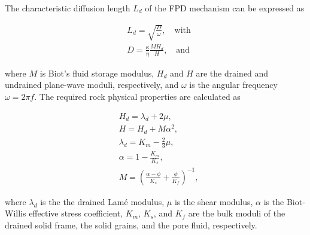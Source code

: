 \documentclass[draft]{agujournal2019}
\begin{document}
The characteristic diffusion length $L_d$ of the FPD mechanism can be expressed as 
\begin{linenomath*}
\begin{equation}\label{Eq.3}
\begin{split}
&L_d=\sqrt{\frac{D}{\omega}},\quad \text{with} \\
&D= \frac {\kappa} {\eta} \frac{M H_d}{H},
 \quad \text{and}  
\end{split}
\end{equation}
\end{linenomath*}
where $M$ is Biot’s fluid storage modulus, $H_d$ and $H$ are the drained and undrained plane-wave moduli, respectively, and $\omega$ is the angular frequency $\omega = 2 \pi f$. 
The required rock physical properties are calculated as
\begin{linenomath*}
\begin{equation}\label{Eq.7}
\begin{split}
& H_d = \lambda_d + 2 \mu, \\
& H = H_d + M \alpha ^2, \\
& \lambda_d= K_m - \frac{2}{3} \mu, \\
& \alpha =1-\frac{K_m}{K_s},\\
& M  =\left( \frac{\alpha-\phi}{K_s} +\frac{\phi}{K_f} \right)^{-1},
\end{split}
\end{equation}
\end{linenomath*}
where $\lambda_d$ is the the drained Lamé modulus, $\mu$ is the shear modulus, $\alpha$ is the Biot-Willis effective stress coefficient, $K_m$, $K_s$, and $K_f$ are the bulk moduli of the drained solid frame, the solid grains, and the pore fluid, respectively.
\end{document}
